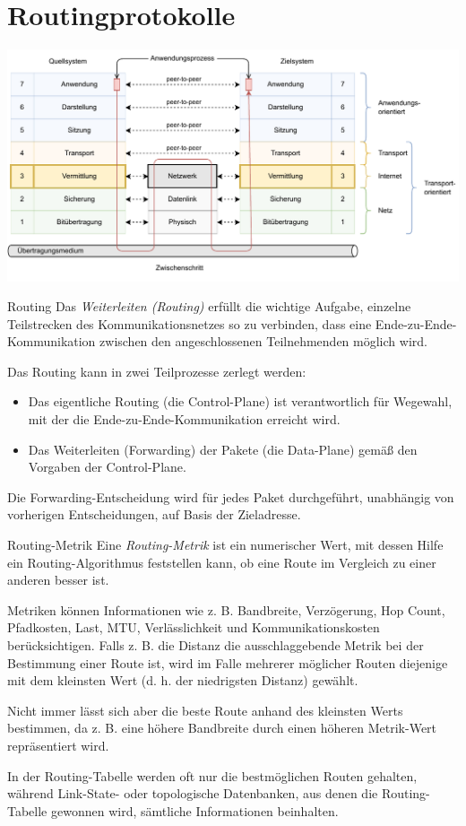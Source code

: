 \section{Routingprotokolle}

\includegraphics[width=\textwidth]{includes/figures/defi_iso_osi_network.pdf}

\begin{defi}{Routing}
    Das \emph{Weiterleiten (Routing)} erfüllt die wichtige Aufgabe, einzelne Teilstrecken des Kommunikationsnetzes so zu verbinden, dass eine Ende-zu-Ende-Kommunikation zwischen den angeschlossenen Teilnehmenden möglich wird.

    Das Routing kann in zwei Teilprozesse zerlegt werden:
    \begin{itemize}
        \item Das eigentliche Routing (die Control-Plane) ist verantwortlich für Wegewahl, mit der die Ende-zu-Ende-Kommunikation erreicht wird.
        \item Das Weiterleiten (Forwarding) der Pakete (die Data-Plane) gemäß den Vorgaben der Control-Plane.
    \end{itemize}

    Die Forwarding-Entscheidung wird für jedes Paket durchgeführt, unabhängig von vorherigen Entscheidungen, auf Basis der Zieladresse.
\end{defi}

\begin{bonus}{Routing-Metrik}
    Eine \emph{Routing-Metrik} ist ein numerischer Wert, mit dessen Hilfe ein Routing-Algorithmus feststellen kann, ob eine Route im Vergleich zu einer anderen besser ist.

    Metriken können Informationen wie z. B. Bandbreite, Verzögerung, Hop Count, Pfadkosten, Last, MTU, Verlässlichkeit und Kommunikationskosten berücksichtigen.
    Falls z. B. die Distanz die ausschlaggebende Metrik bei der Bestimmung einer Route ist, wird im Falle mehrerer möglicher Routen diejenige mit dem kleinsten Wert (d. h. der niedrigsten Distanz) gewählt.

    Nicht immer lässt sich aber die beste Route anhand des kleinsten Werts bestimmen, da z. B. eine höhere Bandbreite durch einen höheren Metrik-Wert repräsentiert wird.

    In der Routing-Tabelle werden oft nur die bestmöglichen Routen gehalten, während Link-State- oder topologische Datenbanken, aus denen die Routing-Tabelle gewonnen wird, sämtliche Informationen beinhalten.
\end{bonus}

